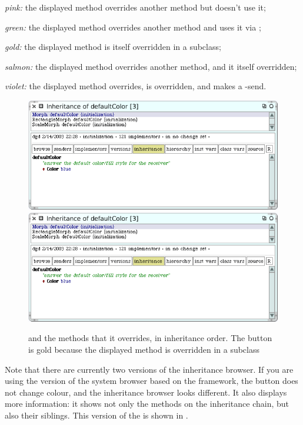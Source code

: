 \documentclass[a4paper,10pt,twoside]{book}
\begin{document}
\newcommand{\colourTag}[1]{\item[{\mdseries \itshape #1}]}

\begin{description}[noitemsep, leftmargin=*, labelindent=6em, labelwidth=4em, labelsep=*]
	\colourTag{pink:} the displayed method overrides another method but doesn't use it;
	\colourTag{green:} the displayed method overrides another method and uses it via \super;
	\colourTag{gold:} the displayed method is itself overridden in a subclass;
	\colourTag{salmon:} the displayed method overrides another method, and it itself overridden;
	\colourTag{violet:} the displayed method overrides, is overridden, and makes a -send.
\end{description}

\begin{figure}[tbp]
	\begin{center}
   \ifluluelse
		{\includegraphics[width=\textwidth]{inheritanceOverriding}}
		{\includegraphics[scale=0.7]{inheritanceOverriding}}
	\end{center}
	\caption{ and the methods that it overrides, in inheritance order. 
	The  button is gold because the displayed method is overridden in a subclass}
	\label{fig:inheritanceOverriding}
\end{figure}

Note that there are currently two versions of the inheritance browser.  If you are using the version of the system browser based on the  framework, the  button does not change colour, and the inheritance browser looks different.  It also displays more information: it shows not only the methods on the inheritance chain, but also their siblings.  This version of the  is shown in .
\end{document}
